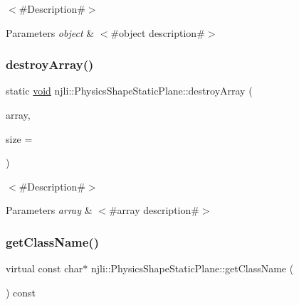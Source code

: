 $<$\#\+Description\#$>$


\begin{DoxyParams}{Parameters}
{\em object} & $<$\#object description\#$>$ \\
\hline
\end{DoxyParams}
\mbox{\label{classnjli_1_1_physics_shape_static_plane_abbae76b7c560dde8822801fa6dceb907}} 
\subsubsection{\texorpdfstring{destroy\+Array()}{destroyArray()}}
{\footnotesize\ttfamily static \mbox{\hyperlink{_thread_8h_af1e856da2e658414cb2456cb6f7ebc66}{void}} njli\+::\+Physics\+Shape\+Static\+Plane\+::destroy\+Array (\begin{DoxyParamCaption}\item[{\mbox{\hyperlink{classnjli_1_1_physics_shape_static_plane}{Physics\+Shape\+Static\+Plane}} $\ast$$\ast$}]{array,  }\item[{const \mbox{\hyperlink{_util_8h_a10e94b422ef0c20dcdec20d31a1f5049}{u32}}}]{size = {} }\end{DoxyParamCaption})\hspace{0.3cm}{\ttfamily [static]}}

$<$\#\+Description\#$>$


\begin{DoxyParams}{Parameters}
{\em array} & $<$\#array description\#$>$ \\
\hline
\end{DoxyParams}
\mbox{\label{classnjli_1_1_physics_shape_static_plane_ae40c449320efcf3c483e7ff67b68b812}} 
\subsubsection{\texorpdfstring{get\+Class\+Name()}{getClassName()}}
{\footnotesize\ttfamily virtual const char$\ast$ njli\+::\+Physics\+Shape\+Static\+Plane\+::get\+Class\+Name (\begin{DoxyParamCaption}{ }\end{DoxyParamCaption}) const\hspace{0.3cm}{\ttfamily [virtual]}}

